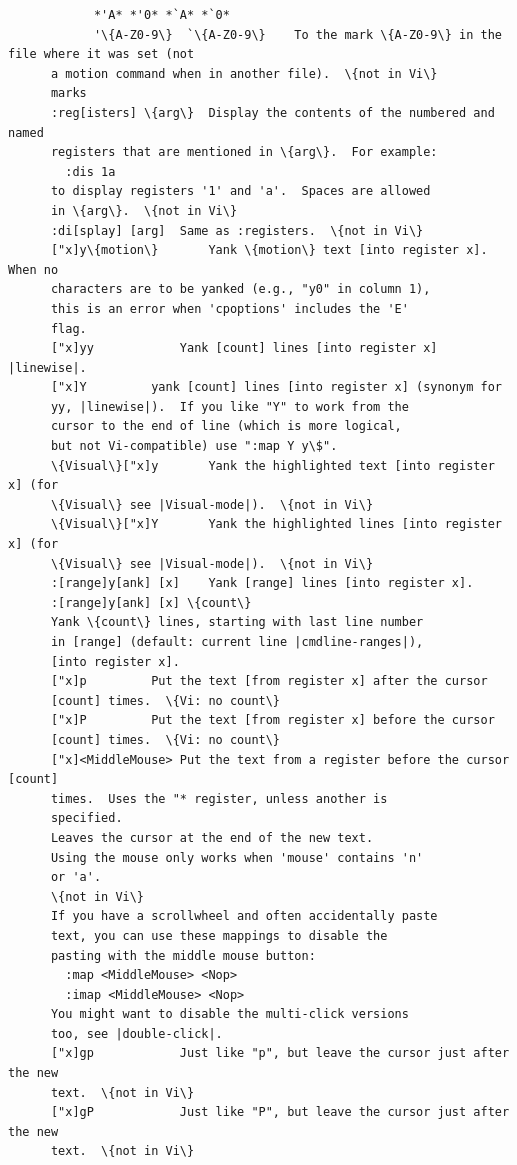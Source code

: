 \documentclass{beamer}
\begin{document}
\begin{frame}[fragile]
\begin{verbatim}
            *'A* *'0* *`A* *`0*
            '\{A-Z0-9\}  `\{A-Z0-9\}    To the mark \{A-Z0-9\} in the file where it was set (not
      a motion command when in another file).  \{not in Vi\}
      marks 
      :reg[isters] \{arg\}  Display the contents of the numbered and named
      registers that are mentioned in \{arg\}.  For example:
        :dis 1a
      to display registers '1' and 'a'.  Spaces are allowed
      in \{arg\}.  \{not in Vi\}
      :di[splay] [arg]  Same as :registers.  \{not in Vi\}
      ["x]y\{motion\}       Yank \{motion\} text [into register x].  When no
      characters are to be yanked (e.g., "y0" in column 1),
      this is an error when 'cpoptions' includes the 'E'
      flag.
      ["x]yy            Yank [count] lines [into register x] |linewise|.
      ["x]Y         yank [count] lines [into register x] (synonym for
      yy, |linewise|).  If you like "Y" to work from the
      cursor to the end of line (which is more logical,
      but not Vi-compatible) use ":map Y y\$".
      \{Visual\}["x]y       Yank the highlighted text [into register x] (for
      \{Visual\} see |Visual-mode|).  \{not in Vi\}
      \{Visual\}["x]Y       Yank the highlighted lines [into register x] (for
      \{Visual\} see |Visual-mode|).  \{not in Vi\}
      :[range]y[ank] [x]    Yank [range] lines [into register x].
      :[range]y[ank] [x] \{count\}
      Yank \{count\} lines, starting with last line number
      in [range] (default: current line |cmdline-ranges|),
      [into register x].
      ["x]p         Put the text [from register x] after the cursor
      [count] times.  \{Vi: no count\}
      ["x]P         Put the text [from register x] before the cursor
      [count] times.  \{Vi: no count\}
      ["x]<MiddleMouse> Put the text from a register before the cursor [count]
      times.  Uses the "* register, unless another is
      specified.
      Leaves the cursor at the end of the new text.
      Using the mouse only works when 'mouse' contains 'n'
      or 'a'.
      \{not in Vi\}
      If you have a scrollwheel and often accidentally paste
      text, you can use these mappings to disable the
      pasting with the middle mouse button:
        :map <MiddleMouse> <Nop>
        :imap <MiddleMouse> <Nop>
      You might want to disable the multi-click versions
      too, see |double-click|.
      ["x]gp            Just like "p", but leave the cursor just after the new
      text.  \{not in Vi\}
      ["x]gP            Just like "P", but leave the cursor just after the new
      text.  \{not in Vi\}
  \end{verbatim}
\end{frame}
\end{document}
